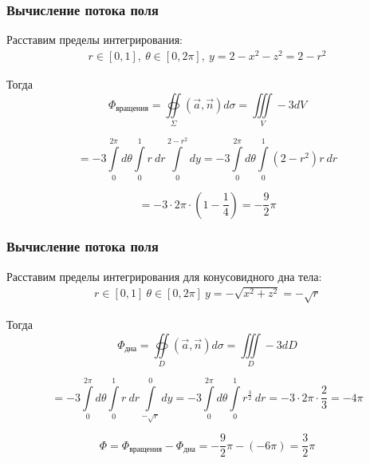 \begin{frame}\frametitle{Вычисление потока поля}
	Расставим пределы интегрирования:
	\begin{align*}
		r \in [0, 1], \
		\theta \in [0, 2\pi], \
		y = 2 - x^2 - z^2 = 2 - r^2
	\end{align*}

	Тогда
	\begin{equation*}
		\Phi_{\text{вращения}} = \oiint\limits_{\Sigma}\left( \vec {a}, \vec {n} \right) d\sigma = \iiint\limits_V -3 dV
	\end{equation*}

	\begin{equation*}
		= -3 \int\limits_{0}^{2 \pi} d \theta
		\int\limits_{0}^{1} r~dr
		\int\limits_{0}^{2-r^2} dy
		= -3 \int\limits_{0}^{2 \pi} d \theta
		\int\limits_{0}^{1} (2-r^2)r~dr
	\end{equation*}

	\begin{equation*}
		= -3 \cdot 2 \pi \cdot
		(1 - \frac{1}{4})
		= - \frac{9}{2}\pi
	\end{equation*}

\end{frame}

\begin{frame}\frametitle{Вычисление потока поля}

	Расставим пределы интегрирования для конусовидного дна тела:
	\begin{align*}
		r \in [0,1] \
		\theta \in [0, 2\pi] \
		y = -\sqrt{x^2 + z^2} = -\sqrt{r}
	\end{align*}

	Тогда
	\begin{equation*}
		\Phi_{\text{дна}}
		=  \oiint\limits_{D}\left( \vec {a}, \vec {n} \right) d\sigma = \iiint\limits_D -3 dD
	\end{equation*}

	\begin{equation*}
		= -3 \int\limits_{0}^{2 \pi} d \theta
		\int\limits_{0}^{1} r~dr
		\int\limits_{-\sqrt{r}}^{0} dy
		= -3 \int\limits_{0}^{2 \pi} d \theta
		\int\limits_{0}^{1}r^{\frac{3}{2}}~dr
		= -3 \cdot 2\pi \cdot \frac{2}{3} = -4 \pi
	\end{equation*}


	\begin{equation*}
		\Phi = \Phi_{\text{вращения}} - \Phi_{\text{дна}} = -\frac{9}{2}\pi - (-6 \pi) = \frac{3}{2}\pi
	\end{equation*}

\end{frame}
